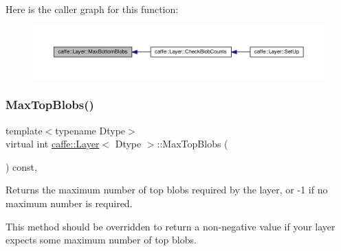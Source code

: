 Here is the caller graph for this function\+:
\nopagebreak
\begin{figure}[H]
\begin{center}
\leavevmode
\includegraphics[width=350pt]{classcaffe_1_1_layer_af8bdc989053e0363ab032026b46de7c3_icgraph}
\end{center}
\end{figure}
\mbox{\label{classcaffe_1_1_layer_ac6c03df0b6e40e776c94001e19994a2e}} 
\subsubsection{\texorpdfstring{Max\+Top\+Blobs()}{MaxTopBlobs()}\hspace{0.1cm}{\footnotesize\ttfamily [1/2]}}
{\footnotesize\ttfamily template$<$typename Dtype$>$ \\
virtual int \mbox{\hyperlink{classcaffe_1_1_layer}{caffe\+::\+Layer}}$<$ Dtype $>$\+::Max\+Top\+Blobs (\begin{DoxyParamCaption}{ }\end{DoxyParamCaption}) const\hspace{0.3cm}{\ttfamily [inline]}, {\ttfamily [virtual]}}



Returns the maximum number of top blobs required by the layer, or -\/1 if no maximum number is required. 

This method should be overridden to return a non-\/negative value if your layer expects some maximum number of top blobs. 

